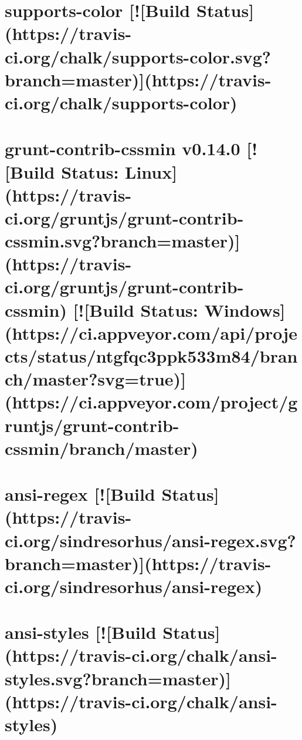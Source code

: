 \documentclass[twoside]{book}
\newcommand{\+}{\discretionary{\mbox{\scriptsize$\hookleftarrow$}}{}{}}
\begin{document}
\chapter{supports-\/color \mbox{[}!\mbox{[}Build Status\mbox{]}(https\+://travis-\/ci.org/chalk/supports-\/color.svg?branch=master)\mbox{]}(https\+://travis-\/ci.org/chalk/supports-\/color)}
\label{md_app_web_node_modules_grunt-contrib-cssmin_node_modules_supports-color_readme}

\chapter{grunt-\/contrib-\/cssmin v0.14.0 \mbox{[}!\mbox{[}Build Status\+: Linux\mbox{]}(https\+://travis-\/ci.org/gruntjs/grunt-\/contrib-\/cssmin.svg?branch=master)\mbox{]}(https\+://travis-\/ci.org/gruntjs/grunt-\/contrib-\/cssmin) \mbox{[}!\mbox{[}Build Status\+: Windows\mbox{]}(https\+://ci.appveyor.\+com/api/projects/status/ntgfqc3ppk533m84/branch/master?svg=true)\mbox{]}(https\+://ci.appveyor.\+com/project/gruntjs/grunt-\/contrib-\/cssmin/branch/master)}
\label{md_app_web_node_modules_grunt-contrib-cssmin__r_e_a_d_m_e}

\chapter{ansi-\/regex \mbox{[}!\mbox{[}Build Status\mbox{]}(https\+://travis-\/ci.org/sindresorhus/ansi-\/regex.svg?branch=master)\mbox{]}(https\+://travis-\/ci.org/sindresorhus/ansi-\/regex)}
\label{md_app_web_node_modules_grunt-contrib-uglify_node_modules_ansi-regex_readme}

\chapter{ansi-\/styles \mbox{[}!\mbox{[}Build Status\mbox{]}(https\+://travis-\/ci.org/chalk/ansi-\/styles.svg?branch=master)\mbox{]}(https\+://travis-\/ci.org/chalk/ansi-\/styles)}
\label{md_app_web_node_modules_grunt-contrib-uglify_node_modules_ansi-styles_readme}

\end{document}
